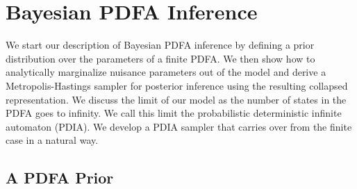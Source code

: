 \section{Bayesian PDFA Inference}

We start our description of Bayesian PDFA inference by defining a prior distribution over the parameters of a finite PDFA.  We then show how to analytically marginalize nuisance parameters out of the model and derive a Metropolis-Hastings sampler for posterior inference using the resulting collapsed representation.  We discuss the limit of our model as the number of states in the PDFA goes to infinity.  We call this limit the probabilistic deterministic infinite automaton (PDIA).  We develop a PDIA sampler that carries over from the finite case in a natural way.


\subsection{A PDFA Prior}

